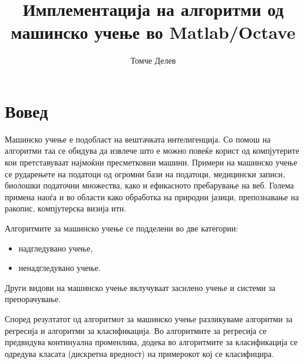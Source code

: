 \documentclass[12pt,a4paper]{article}
\begin{document}
\title{Имплементација на алгоритми од машинско учење во Matlab/Octave}

\author{Томче Делев}
\date{}

\maketitle

\tableofcontents

\newpage

\section{Вовед}

Машинско учење е подобласт на вештачката интелигенција. Со помош на алгоритми
таа се обидува да извлече што е можно повеќе корист од компјутерите кои
претставуваат најмоќни пресметковни машини. Примери на машинско учење се
рударењете на податоци од огромни бази на податоци, медицински записи, биолошки
податочни множества, како и ефикасното пребарување на веб. Голема примена наоѓа
и во области како обработка на природни јазици, препознавање на ракопис,
компјутерска визија итн.

Алгоритмите за машинско учење се подделени во две категории:
\begin{itemize}
  \item надгледувано учење,
  \item ненадгледувано учење.
\end{itemize}
Други видови на машинско учење вклучуваат засилено учење и системи за
препорачување.

Според резултатот од алгоритмот за машинско учење разликуваме алгоритми за
регресија и алгоритми за класификација. Во алгоритмите за регресија се
предвидува континуална променлива, додека во алгоритмите за класификација се
одредува класата (дискретна вредност) на примерокот кој се класифицира.







\end{document}
